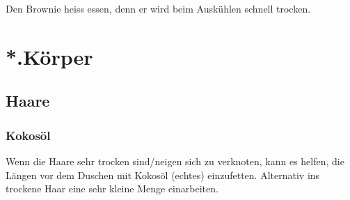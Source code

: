 Den Brownie heiss essen, denn er wird beim Auskühlen schnell trocken.
\section{*.Körper}
\subsection{Haare}
\subsubsection{Kokosöl}
Wenn die Haare sehr trocken sind/neigen sich zu verknoten, kann es helfen, die Längen vor dem Duschen mit Kokosöl (echtes) einzufetten. Alternativ ins trockene Haar eine sehr kleine Menge einarbeiten.